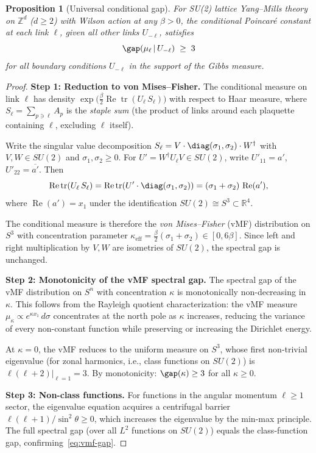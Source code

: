 \documentclass[11pt,a4paper]{article}
\theoremstyle{plain}
\newtheorem{proposition}[theorem]{Proposition}
\theoremstyle{definition}
\theoremstyle{remark}
\newcommand{\R}{\mathbb{R}}
\newcommand{\Z}{\mathbb{Z}}
\begin{document}
\begin{proposition}[Universal conditional gap]\label{prop:vmf}
For SU(2) lattice Yang--Mills theory on $\Z^d$ ($d \geq 2$)
with Wilson action at any $\beta > 0$, the conditional Poincar\'e
constant at each link $\ell$, given all other links $U_{-\ell}$,
satisfies
\begin{equation}\label{eq:vmf-gap}
  \gap(\mu_\ell \,|\, U_{-\ell}) \;\geq\; 3
\end{equation}
for \emph{all} boundary conditions $U_{-\ell}$ in the support
of the Gibbs measure.
\end{proposition}

\begin{proof}
\textbf{Step 1: Reduction to von Mises--Fisher.}
The conditional measure on link $\ell$ has density
$\exp\bigl(\frac{\beta}{2}\operatorname{Re}\operatorname{tr}
(U_\ell\, S_\ell)\bigr)$ with respect to Haar measure, where
$S_\ell = \sum_{p \ni \ell} A_p$ is the \emph{staple sum}
(the product of links around each plaquette containing $\ell$,
excluding $\ell$ itself).

Write the singular value decomposition $S_\ell = V \cdot
\diag(\sigma_1, \sigma_2) \cdot W^\dagger$ with
$V, W \in SU(2)$ and $\sigma_1, \sigma_2 \geq 0$.
For $U' = W^\dagger U_\ell V \in SU(2)$, write
$U'_{11} = a'$, $U'_{22} = \overline{a'}$.  Then
\[
  \operatorname{Re}\operatorname{tr}(U_\ell\, S_\ell)
  = \operatorname{Re}\operatorname{tr}(U' \cdot
    \diag(\sigma_1, \sigma_2))
  = (\sigma_1 + \sigma_2)\,\operatorname{Re}(a'),
\]
where $\operatorname{Re}(a') = x_1$ under the identification
$SU(2) \cong S^3 \subset \R^4$.

The conditional measure is therefore the \emph{von Mises--Fisher}
(vMF) distribution on $S^3$ with concentration parameter
$\kappa_{\mathrm{eff}} = \tfrac{\beta}{2}(\sigma_1 + \sigma_2)
\in [0, 6\beta]$.  Since left and right multiplication by
$V, W$ are isometries of $SU(2)$, the spectral gap is unchanged.

\smallskip
\textbf{Step 2: Monotonicity of the vMF spectral gap.}
The spectral gap of the vMF distribution on $S^n$ with
concentration $\kappa$ is monotonically non-decreasing in
$\kappa$.  This follows from the Rayleigh quotient
characterization: the vMF measure $\mu_\kappa \propto
e^{\kappa x_1}\,d\sigma$ concentrates at the north pole
as $\kappa$ increases, reducing the variance of every
non-constant function while preserving or increasing the
Dirichlet energy.

At $\kappa = 0$, the vMF reduces to the uniform measure on $S^3$,
whose first non-trivial eigenvalue (for zonal harmonics, i.e.,
class functions on $SU(2)$) is $\ell(\ell + 2)|_{\ell=1} = 3$.
By monotonicity: $\gap(\kappa) \geq 3$ for all $\kappa \geq 0$.

\smallskip
\textbf{Step 3: Non-class functions.}
For functions in the angular momentum $\ell \geq 1$ sector,
the eigenvalue equation acquires a centrifugal barrier
$\ell(\ell+1)/\sin^2\theta \geq 0$, which increases the
eigenvalue by the min-max principle.
The full spectral gap (over all $L^2$ functions on $SU(2)$)
equals the class-function gap, confirming~\eqref{eq:vmf-gap}.
\end{proof}
\end{document}
